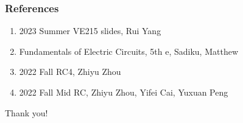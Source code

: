 \documentclass{beamer}
\begin{document}
\begin{frame}
\frametitle{References}
\begin{enumerate}
\item 2023 Summer VE215 slides, Rui Yang
\item Fundamentals of Electric Circuits, 5th e, Sadiku, Matthew
\item 2022 Fall RC4, Zhiyu Zhou
\item 2022 Fall Mid RC, Zhiyu Zhou, Yifei Cai, Yuxuan Peng
\end{enumerate}
\end{frame}


\begin{frame}
\Huge{\centerline{Thank you!}}
\end{frame}
\end{document}

